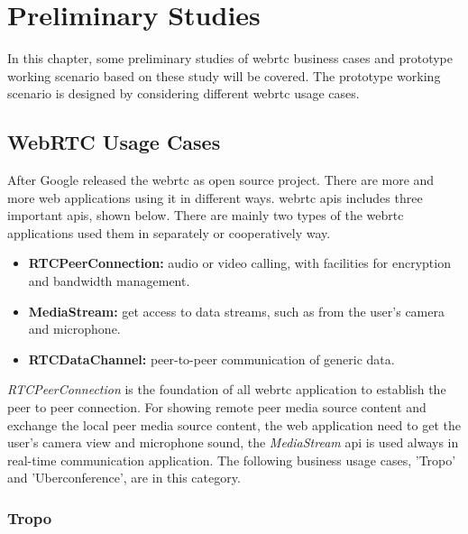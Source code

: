 \chapter{Preliminary Studies}
\label{chp:pre_study}

\noindent In this chapter, some preliminary studies of \gls{webrtc} business cases and prototype working scenario based on these study will be covered. The prototype working scenario is designed by considering different \gls{webrtc} usage cases.

\section{WebRTC Usage Cases}

\noindent After Google released the \gls{webrtc} as open source project. There are more and more web applications using it in different ways. \gls{webrtc} \gls{api}s includes three important \gls{api}s, shown below. There are mainly two types of the \gls{webrtc} applications used them in separately or cooperatively way.

\begin{itemize}[topsep=-1em,parsep=0em,itemsep=0em]
 \item \textbf{RTCPeerConnection:} audio or video calling, with facilities for encryption and bandwidth management.
  \item \textbf{MediaStream:} get access to data streams, such as from the user's camera and microphone.
 \item \textbf{RTCDataChannel:} peer-to-peer communication of generic data.
\end{itemize}

\par \textit{RTCPeerConnection} is the foundation of all \gls{webrtc} application to establish the peer to peer connection. For showing remote peer media source content and exchange the local peer media source content, the web application need to get the user's camera view and microphone sound, the \textit{MediaStream} \gls{api} is used always in real-time communication application. The following business usage cases, 'Tropo' and 'Uberconference', are in this category.

\subsection{Tropo}

